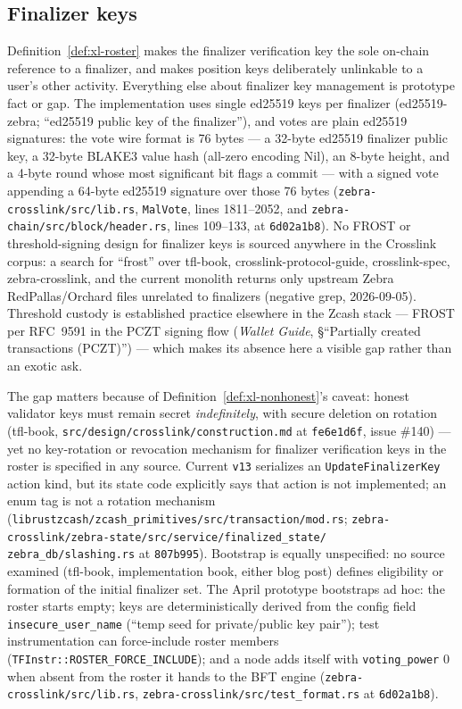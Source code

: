 \documentclass[11pt,a4paper]{article}
\theoremstyle{definition}
\begin{document}
\subsection{Finalizer keys}\label{sec:xl-stake-keys}

Definition~\ref{def:xl-roster} makes the finalizer verification key the
sole on-chain reference to a finalizer, and makes position keys
deliberately unlinkable to a user's other activity. Everything else about
finalizer key management is prototype fact or gap. The implementation
uses single ed25519 keys per finalizer (ed25519-zebra; ``ed25519 public
key of the finalizer''), and votes are plain ed25519 signatures: the vote
wire format is 76 bytes --- a 32-byte ed25519 finalizer public key, a
32-byte BLAKE3 value hash (all-zero encoding Nil), an 8-byte height, and
a 4-byte round whose most significant bit flags a commit --- with a
signed vote appending a 64-byte ed25519 signature over those 76 bytes
(\texttt{zebra-crosslink/src/lib.rs}, \texttt{MalVote}, lines
1811--2052, and \texttt{zebra-chain/src/block/header.rs}, lines
109--133, at \texttt{6d02a1b8}). No FROST
or threshold-signing design for finalizer keys is sourced anywhere in the
Crosslink corpus: a search for ``frost'' over tfl-book,
crosslink-protocol-guide, crosslink-spec, zebra-crosslink, and the current
monolith returns
only upstream Zebra RedPallas/Orchard files unrelated to finalizers
(negative grep, 2026-09-05). Threshold custody is established practice
elsewhere in the Zcash stack --- FROST per RFC~9591 in the PCZT signing
flow (\emph{Wallet Guide}, \S``Partially created transactions (PCZT)'')
--- which makes its absence here a visible gap rather than an exotic ask.

The gap matters because of Definition~\ref{def:xl-nonhonest}'s caveat:
honest validator keys must remain secret \emph{indefinitely}, with secure
deletion on rotation (tfl-book,
\texttt{src/design/crosslink/construction.md} at \texttt{fe6e1d6f},
issue \#140) --- yet no key-rotation or revocation mechanism for
finalizer verification keys in the roster is specified in any source.
Current \texttt{v13} serializes an \texttt{UpdateFinalizerKey} action
kind, but its state code explicitly says that action is not implemented;
an enum tag is not a rotation mechanism
(\texttt{librustzcash/zcash\_primitives/src/transaction/mod.rs};
\texttt{zebra-crosslink/zebra-state/src/service/finalized\_state/}%
\texttt{zebra\_db/slashing.rs}
at \texttt{807b995}).
Bootstrap is equally unspecified: no source examined (tfl-book,
implementation book, either blog post) defines eligibility or formation
of the initial finalizer set. The April prototype bootstraps ad hoc: the
roster starts empty; keys are deterministically derived from the config field
\texttt{insecure\_user\_name} (``temp seed for private/public key
pair''); test instrumentation can force-include roster members
(\texttt{TFInstr::ROSTER\_FORCE\_INCLUDE}); and a node adds itself with
\texttt{voting\_power} 0 when absent from the roster it hands to the BFT
engine (\texttt{zebra-crosslink/src/lib.rs},
\texttt{zebra-crosslink/src/test\_format.rs} at \texttt{6d02a1b8}).
\end{document}

